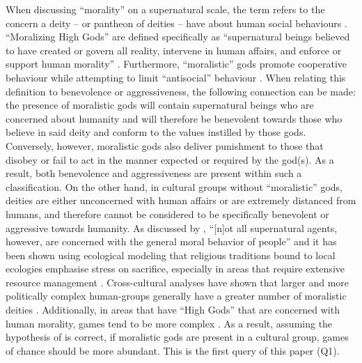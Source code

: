\documentclass[%
	]{ijsra}
\begin{document}
When discussing ``morality” on a supernatural scale, the term refers to the concern a deity – or pantheon of deities – have about human social behaviours \parencite{purzycki2016}. ``Moralizing High Gods” are defined specifically as ``supernatural beings believed to have created or govern all reality, intervene in human affairs, and enforce or support human morality” \parencite[16784]{botero2014}. Furthermore, ``moralistic” gods promote cooperative behaviour while attempting to limit ``antisocial” behaviour \parencite[165]{purzycki2016}. When relating this definition to benevolence or aggressiveness, the following connection can be made: the presence of moralistic gods will contain supernatural beings who are concerned about humanity and will therefore be benevolent towards those who believe in said deity and conform to the values instilled by those gods. Conversely, however, moralistic gods also deliver punishment to those that disobey or fail to act in the manner expected or required by the god(s). As a result, both benevolence and aggressiveness are present within such a classification. On the other hand, in cultural groups without ``moralistic” gods, deities are either unconcerned with human affairs or are extremely distanced from humans, and therefore cannot be considered to be specifically benevolent or aggressive towards humanity. As discussed by \parencite[85]{purzycki2011}, ``[n]ot all supernatural agents, however, are concerned with the general moral behavior of people” and it has been shown using ecological modeling that religious traditions bound to local ecologies emphasise stress on sacrifice, especially in areas that require extensive resource management \parencite{lansing1993}. Cross-cultural analyses have shown that larger and more politically complex human-groups generally have a greater number of moralistic deities \parencite{purzycki2016}. Additionally, in areas that have ``High Gods” that are concerned with human morality, games tend to be more complex \parencite[290]{ball1972}. As a result, assuming the hypothesis of \textcite{roberts1959} is correct, if moralistic gods are present in a cultural group, games of chance should be more abundant. This is the first query of this paper (Q1).
\end{document}
